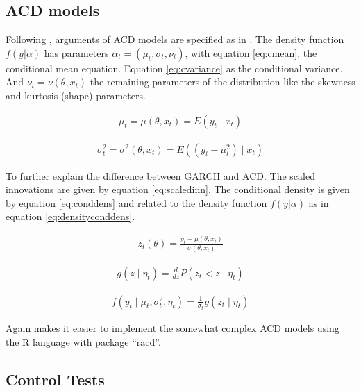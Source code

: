\documentclass[a4paper, twoside]{templates/ociamthesis}
\begin{document}
\hypertarget{acd-models-meth}{%
\subsection{ACD models}\label{acd-models-meth}}

Following \textcite{ghalanos2016}, arguments of ACD models are specified as in \textcite{hansen1994}. The density function \(f(y|\alpha)\) has parameters \(\alpha_t = (\mu_t, \sigma_t, \nu_t)\), with equation \eqref{eq:cmean}, the conditional mean equation. Equation \eqref{eq:cvariance} as the conditional variance. And \(\nu_t=\nu(\theta,x_t)\) the remaining parameters of the distribution like the skewness and kurtosis (shape) parameters.

\begin{align} 
\mu_{t}=\mu\left(\theta, x_{t}\right)=E\left(y_{t} \mid x_{t}\right)
 \label{eq:cmean}
\end{align}

\begin{align}
\sigma_{t}^{2}=\sigma^{2}\left(\theta, x_{t}\right)=E\left(\left(y_{t}-\mu_{t}^{2}\right) \mid x_{t}\right)
 \label{eq:cvariance}
\end{align}

To further explain the difference between GARCH and ACD. The scaled innovations are given by equation \eqref{eq:scaledinn}. The conditional density is given by equation \eqref{eq:conddens} and related to the density function \(f(y|\alpha)\) as in equation \eqref{eq:densityconddens}.

\begin{align}
z_{t}(\theta)=\frac{y_{t}-\mu\left(\theta, x_{t}\right)}{\sigma\left(\theta, x_{t}\right)}
\label{eq:scaledinn}
\end{align}

\begin{align}
g\left(z \mid \eta_{t}\right)=\frac{d}{d z} P\left(z_{t}<z \mid \eta_{t}\right)
\label{eq:conddens}
\end{align}

\begin{align}
f\left(y_{t} \mid \mu_{t}, \sigma_{t}^{2}, \eta_{t}\right)=\frac{1}{\sigma_{t}} g\left(z_{t} \mid \eta_{t}\right)
\end{align}
\label{eq:densityconddens}

Again \textcite{ghalanos2016} makes it easier to implement the somewhat complex ACD models using the R language with package ``racd''.

\hypertarget{control-tests}{%
\subsection{Control Tests}\label{control-tests}}
\end{document}

